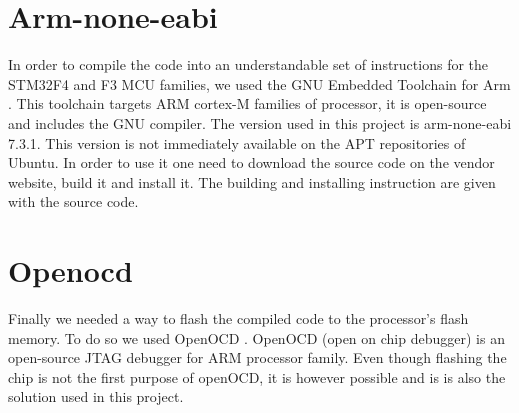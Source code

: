 \documentclass[12pt,a4paper]{report}
\begin{document}
\section{Arm-none-eabi}
In order to compile the code into an understandable set of instructions for the STM32F4 and F3 MCU families, we used the GNU Embedded Toolchain for Arm \cite{arm}. This toolchain targets ARM cortex-M families of processor, it is open-source and includes the GNU compiler. The version used in this project is arm-none-eabi 7.3.1. This version is not immediately available on the APT repositories of Ubuntu. In order to use it one need to download the source code on the vendor website, build it and install it. The building and installing instruction are given with the source code.

\section{Openocd}
Finally we needed a way to flash the compiled code to the processor's flash memory. To do so we used OpenOCD \cite{hoglAbstractopen}. OpenOCD (open on chip debugger) is an open-source JTAG debugger for ARM processor family. Even though flashing the chip is not the first purpose of openOCD, it is however possible and is is also the solution used in this project.
\end{document}
